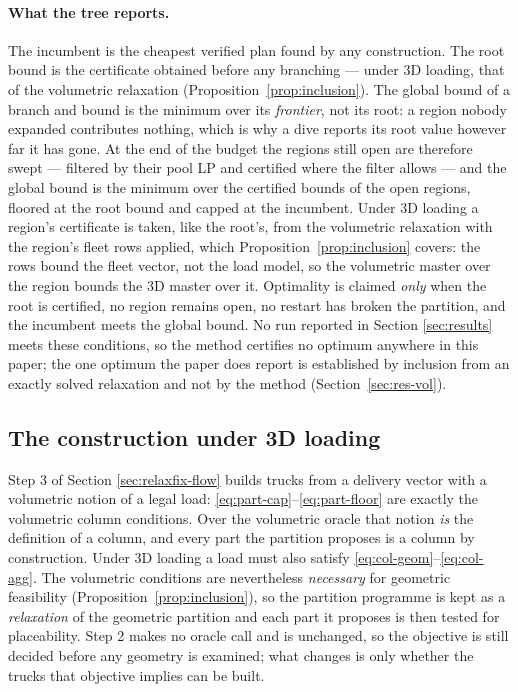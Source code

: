 \paragraph{What the tree reports.}
The incumbent is the cheapest verified plan found by any construction.
The root bound is the certificate obtained before any branching ---
under 3D loading, that of the volumetric relaxation
(Proposition~\ref{prop:inclusion}). The global bound of a branch and
bound is the minimum over its \emph{frontier}, not its root: a region
nobody expanded contributes nothing, which is why a dive reports its
root value however far it has gone. At the end of the budget the regions
still open are therefore swept --- filtered by their pool LP and
certified where the filter allows --- and the global bound is the minimum
over the certified bounds of the open regions, floored at the root bound
and capped at the incumbent. Under 3D loading a region's certificate is
taken, like the root's, from the volumetric relaxation with the region's
fleet rows applied, which Proposition~\ref{prop:inclusion} covers: the
rows bound the fleet vector, not the load model, so the volumetric
master over the region bounds the 3D master over it. Optimality is
claimed \emph{only} when the root is certified, no region remains open,
no restart has broken the partition, and the incumbent meets the global
bound. No run reported in Section \ref{sec:results} meets these
conditions, so the method certifies no optimum anywhere in this paper;
the one optimum the paper does report is established by inclusion from
an exactly solved relaxation and not by the method
(Section~\ref{sec:res-vol}).







\subsection{The construction under 3D loading}
\label{sec:geo3d}

Step 3 of Section \ref{sec:relaxfix-flow} builds trucks from a delivery
vector with a volumetric notion of a legal load:
\eqref{eq:part-cap}--\eqref{eq:part-floor} are exactly the volumetric
column conditions. Over the volumetric oracle that notion \emph{is} the
definition of a column, and every part the partition proposes is a
column by construction. Under 3D loading a load must also satisfy
\eqref{eq:col-geom}--\eqref{eq:col-agg}. The volumetric conditions are
nevertheless \emph{necessary} for geometric feasibility
(Proposition~\ref{prop:inclusion}), so the partition programme is kept
as a \emph{relaxation} of the geometric partition and each part it
proposes is then tested for placeability. Step 2 makes no oracle call
and is unchanged, so the objective is still decided before any geometry
is examined; what changes is only whether the trucks that objective
implies can be built.

